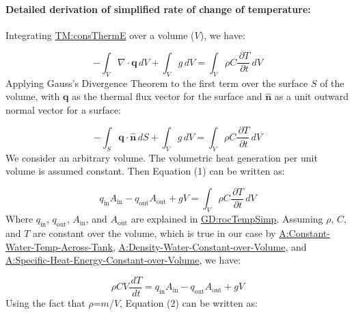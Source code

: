 \documentclass[12pt]{article}
\begin{document}
\paragraph{Detailed derivation of simplified rate of change of temperature:}
\label{GD:rocTempSimpDeriv}
Integrating \hyperref[TM:consThermE]{TM:consThermE} over a volume ($V$), we have:

\begin{displaymath}
-\int_{V}{∇\cdot{}\symbf{q}}\,dV+\int_{V}{g}\,dV=\int_{V}{ρ C \frac{\,\partial{}T}{\,\partial{}t}}\,dV
\end{displaymath}
Applying Gauss's Divergence Theorem to the first term over the surface $S$ of the volume, with $\symbf{q}$ as the thermal flux vector for the surface and $\symbf{\hat{n}}$ as a unit outward normal vector for a surface:

\begin{displaymath}
-\int_{S}{\symbf{q}\cdot{}\symbf{\hat{n}}}\,dS+\int_{V}{g}\,dV=\int_{V}{ρ C \frac{\,\partial{}T}{\,\partial{}t}}\,dV
\end{displaymath}
We consider an arbitrary volume. The volumetric heat generation per unit volume is assumed constant. Then Equation (1) can be written as:

\begin{displaymath}
{q_{\text{in}}} {A_{\text{in}}}-{q_{\text{out}}} {A_{\text{out}}}+g V=\int_{V}{ρ C \frac{\,\partial{}T}{\,\partial{}t}}\,dV
\end{displaymath}
Where ${q_{\text{in}}}$, ${q_{\text{out}}}$, ${A_{\text{in}}}$, and ${A_{\text{out}}}$ are explained in \hyperref[GD:rocTempSimp]{GD:rocTempSimp}. Assuming $ρ$, $C$, and $T$ are constant over the volume, which is true in our case by \hyperref[assumpCWTAT]{A:Constant-Water-Temp-Across-Tank}, \hyperref[assumpDWCoW]{A:Density-Water-Constant-over-Volume}, and \hyperref[assumpSHECoW]{A:Specific-Heat-Energy-Constant-over-Volume}, we have:

\begin{displaymath}
ρ C V \frac{\,dT}{\,dt}={q_{\text{in}}} {A_{\text{in}}}-{q_{\text{out}}} {A_{\text{out}}}+g V
\end{displaymath}
Using the fact that $ρ$=$m$/$V$, Equation (2) can be written as:
\end{document}
